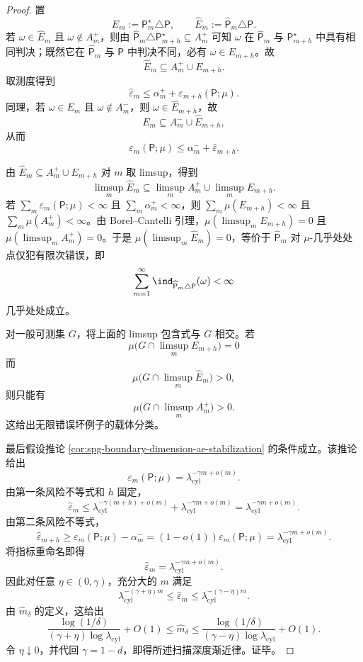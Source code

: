 \begin{proof}
置
\[
E_m:=\mathsf P_m^\star\triangle\mathsf P,
\qquad
\widehat E_m:=\widehat{\mathsf P}_m\triangle\mathsf P.
\]
若 \(\omega\in\widehat E_m\) 且 \(\omega\notin A_m^+\)，则由
\(\widehat{\mathsf P}_m\triangle\mathsf P_{m+h}^\star\subseteq A_m^+\) 可知 \(\omega\) 在 \(\widehat{\mathsf P}_m\) 与 \(\mathsf P_{m+h}^\star\) 中具有相同判决；既然它在 \(\widehat{\mathsf P}_m\) 与 \(\mathsf P\) 中判决不同，必有 \(\omega\in E_{m+h}\)。故
\[
\widehat E_m\subseteq A_m^+\cup E_{m+h}.
\]
取测度得到
\[
\widehat\varepsilon_m\le\alpha_m^++\varepsilon_{m+h}(\mathsf P;\mu).
\]
同理，若 \(\omega\in E_m\) 且 \(\omega\notin A_m^-\)，则 \(\omega\in\widehat E_{m+h}\)，故
\[
E_m\subseteq A_m^-\cup\widehat E_{m+h},
\]
从而
\[
\varepsilon_m(\mathsf P;\mu)\le\alpha_m^-+\widehat\varepsilon_{m+h}.
\]

由 \(\widehat E_m\subseteq A_m^+\cup E_{m+h}\) 对 \(m\) 取 limsup，得到
\[
\limsup_m\widehat E_m\subseteq \limsup_m A_m^+\cup\limsup_m E_{m+h}.
\]
若 \(\sum_m\varepsilon_m(\mathsf P;\mu)<\infty\) 且 \(\sum_m\alpha_m^+<\infty\)，则 \(\sum_m\mu(E_{m+h})<\infty\) 且 \(\sum_m\mu(A_m^+)<\infty\)。由 Borel--Cantelli 引理，\(\mu(\limsup_m E_{m+h})=0\) 且 \(\mu(\limsup_m A_m^+)=0\)。于是 \(\mu(\limsup_m\widehat E_m)=0\)，等价于 \(\widehat{\mathsf P}_m\) 对 \(\mu\)-几乎处处点仅犯有限次错误，即
\[
\sum_{m=1}^\infty \ind_{\widehat{\mathsf P}_m\triangle\mathsf P}(\omega)<\infty
\]
几乎处处成立。

对一般可测集 \(G\)，将上面的 limsup 包含式与 \(G\) 相交。若
\[
\mu\bigl(G\cap\limsup_m E_{m+h}\bigr)=0
\]
而
\[
\mu\bigl(G\cap\limsup_m\widehat E_m\bigr)>0,
\]
则只能有
\[
\mu\bigl(G\cap\limsup_m A_m^+\bigr)>0.
\]
这给出无限错误坏例子的载体分类。

最后假设推论 \ref{cor:spg-boundary-dimension-ae-stabilization} 的条件成立。该推论给出
\[
\varepsilon_m(\mathsf P;\mu)=\lambda_{\mathrm{cyl}}^{-\gamma m+o(m)}.
\]
由第一条风险不等式和 \(h\) 固定，
\[
\widehat\varepsilon_m
\le
\lambda_{\mathrm{cyl}}^{-\gamma(m+h)+o(m)}+\lambda_{\mathrm{cyl}}^{-\gamma m+o(m)}
=
\lambda_{\mathrm{cyl}}^{-\gamma m+o(m)}.
\]
由第二条风险不等式，
\[
\widehat\varepsilon_{m+h}\ge \varepsilon_m(\mathsf P;\mu)-\alpha_m^-
=
(1-o(1))\varepsilon_m(\mathsf P;\mu)
=
\lambda_{\mathrm{cyl}}^{-\gamma m+o(m)}.
\]
将指标重命名即得
\[
\widehat\varepsilon_m=\lambda_{\mathrm{cyl}}^{-\gamma m+o(m)}.
\]
因此对任意 \(\eta\in(0,\gamma)\)，充分大的 \(m\) 满足
\[
\lambda_{\mathrm{cyl}}^{-(\gamma+\eta)m}\le \widehat\varepsilon_m\le
\lambda_{\mathrm{cyl}}^{-(\gamma-\eta)m}.
\]
由 \(\widehat m_\delta\) 的定义，这给出
\[
\frac{\log(1/\delta)}{(\gamma+\eta)\log\lambda_{\mathrm{cyl}}}+O(1)
\le
\widehat m_\delta
\le
\frac{\log(1/\delta)}{(\gamma-\eta)\log\lambda_{\mathrm{cyl}}}+O(1).
\]
令 \(\eta\downarrow0\)，并代回 \(\gamma=1-d\)，即得所述扫描深度渐近律。证毕。
\end{proof}

